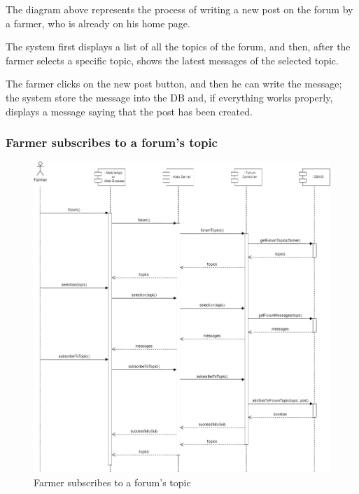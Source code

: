 \documentclass{article}
\begin{document}
        The diagram above represents the process of writing a new post on the forum by a farmer, who is already on his home page. \par
        The system first displays a list of all the topics of the forum, and then, after the farmer selects a specific topic, shows the latest messages of the selected topic. \par
        The farmer clicks on the new post button, and then he can write the message; the system store the message into the DB and, if everything works properly, displays a message saying that the post has been created. \par
        
    
    \newpage
    
    
    \subsubsection{Farmer subscribes to a forum's topic}
        \begin{figure} [h]
            \centering
            \includegraphics[width=1\textwidth]{images/ArchitecturalDesign/RuntimeView/8. FarmerSubscribeForumTopic.jpg}
            \caption{\label{fig:farmerSubscribeTopic}Farmer subscribes to a forum's topic}
        \end{figure}
        
\end{document}
